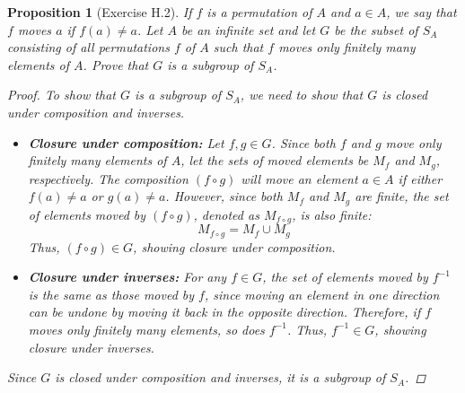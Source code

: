 \documentclass[12pt]{article}
\newtheorem{proposition}{Proposition}
\begin{document}
\begin{proposition}[Exercise H.2]
  If $f$ is a permutation of $A$ and $a \in A$, we say that $f$ moves $a$ if $f(a) \neq a$.
  Let $A$ be an infinite set and let $G$ be the subset of $S_A$ consisting of all permutations $f$ of $A$ such that $f$ moves only finitely many elements of $A$.
  Prove that $G$ is a subgroup of $S_A$.
  \begin{proof}
    To show that $G$ is a subgroup of $S_A$, we need to show that $G$ is closed under composition and inverses.
    \begin{itemize}
      \item \textbf{Closure under composition:} Let $f, g \in G$.
            Since both $f$ and $g$ move only finitely many elements of $A$, let the sets of moved elements be $M_f$ and $M_g$, respectively.
            The composition $(f \circ g)$ will move an element $a \in A$ if either $f(a) \neq a$ or $g(a) \neq a$.
            However, since both $M_f$ and $M_g$ are finite, the set of elements moved by $(f \circ g)$, denoted as $M_{f \circ g}$, is also finite:
            \[
              M_{f \circ g} = M_f \cup M_g
            \]
            Thus, $(f \circ g) \in G$, showing closure under composition.

      \item \textbf{Closure under inverses:} For any $f \in G$, the set of elements moved by $f^{-1}$ is the same as those moved by $f$,
            since moving an element in one direction can be undone by moving it back in the opposite direction.
            Therefore, if $f$ moves only finitely many elements, so does $f^{-1}$.
            Thus, $f^{-1} \in G$, showing closure under inverses.
    \end{itemize}
    Since $G$ is closed under composition and inverses, it is a subgroup of $S_A$.
  \end{proof}
\end{proposition}
\end{document}
